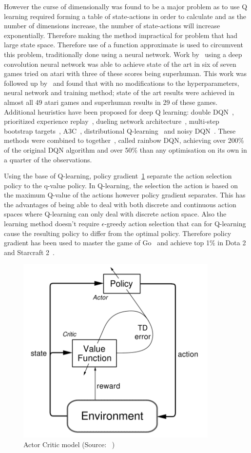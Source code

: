 However the curse of dimensionally was found to be a major problem as to use Q learning required
forming a table of state-actions in order to calculate and as the number of dimensions increase, the number of
state-actions will increase exponentially. Therefore making the method impractical for problem that had large state
space. Therefore use of a function approximate is used to circumvent this problem, traditionally done using a neural
network. Work by~\cite{atari} using a deep convolution neural network was able to achieve state of the art in six of seven
games tried on atari with three of these scores being superhuman. This work was followed up by~\cite{mnih2015humanlevel}
and found that with no modifications to the hyperparameters, neural network and training method; state of the art results were
achieved in almost all 49 atari games and superhuman results in 29 of these games. Additional heuristics have been
proposed for deep Q learning: double DQN~\citep{doubledqn}, prioritized experience replay~\citep{prioritizedexperiencereplay},
dueling network architecture~\citep{duelingdqn}, multi-step bootstrap targets~\citep{multi-step-dqn, Sutton1998},
A3C~\cite{A3C}, distributional Q-learning~\citep{distributional_dqn} and noisy DQN~\citep{noisy_dqn}. These methods were
combined to together~\cite{rainbow}, called rainbow DQN, achieving over 200\% of the original DQN algorithm and over
50\% than any optimisation on its own in a quarter of the observations.

Using the base of Q-learning, policy gradient~\ref{fig:actor-critic-model} separate the action selection policy to the
q-value policy. In Q-learning, the selection the action is based on the maximum Q-value of the actions however policy
gradient separates. This has the advantages of being able to deal with both discrete and continuous action spaces where
Q-learning can only deal with discrete action space. Also the learning method doesn't require $\epsilon$-greedy action
selection that can for Q-learning cause the resulting policy to differ from the optimal policy. Therefore policy
gradient has been used to master the game of Go~\citep{silver2017mastering} and achieve top 1\% in
Dota 2~\citep{OpenAI_dota} and Starcraft 2~\citep{starcraft2}.

\begin{figure}[h]
    \includegraphics[width=10cm]{figures/actor-critic.png}
    \caption{Actor Critic model (Source: ~\cite{Sutton1998})}
    \label{fig:actor-critic-model}
\end{figure}